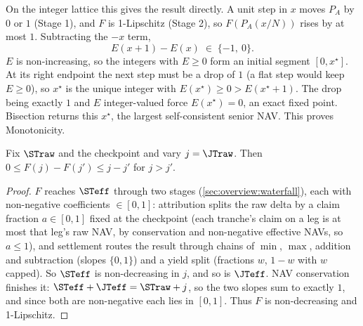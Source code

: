 On the integer lattice this gives the result directly. A unit step in
$x$ moves $P_A$ by $0$ or $1$ (Stage 1), and $F$ is 1-Lipschitz (Stage
2), so $F(P_A(x/N))$ rises by at most $1$. Subtracting the $-x$ term,
\[
  E(x{+}1) - E(x) \;\in\; \{-1,\ 0\}.
\]
$E$ is non-increasing, so the integers with $E \geq 0$ form an initial
segment $[0, x^\star]$. At its right endpoint the next step must be a drop of
$1$ (a flat step would keep $E \geq 0$), so $x^\star$ is the unique
integer with $E(x^\star) \geq 0 > E(x^\star{+}1)$. The drop being
exactly $1$ and $E$ integer-valued force $E(x^\star) = 0$, an exact
fixed point. Bisection returns this $x^\star$, the largest
self-consistent senior NAV. This proves Monotonicity.

\begin{lemma}
\label{lem:F}
Fix $\STraw$ and the checkpoint and vary $j = \JTraw$. Then
$0 \leq F(j) - F(j') \leq j - j'$ for $j > j'$.
\end{lemma}

\begin{proof}
$F$ reaches $\STeff$ through two stages
(\cref{sec:overview:waterfall}), each with non-negative coefficients
$\in [0,1]$: attribution splits the raw delta by a claim fraction
$a \in [0,1]$ fixed at the checkpoint (each tranche's claim on a leg is
at most that leg's raw NAV, by conservation and non-negative effective
NAVs, so $a \leq 1$), and
settlement routes the result
through chains of $\min$, $\max$, addition and subtraction (slopes
$\{0,1\}$) and a yield split (fractions $w$, $1-w$ with $w$ capped).
So $\STeff$ is non-decreasing in $j$, and so is $\JTeff$. NAV
conservation finishes it: $\STeff + \JTeff = \STraw + j$, so the two
slopes sum to exactly $1$, and since both are non-negative each lies in
$[0,1]$. Thus $F$ is non-decreasing and 1-Lipschitz.
\end{proof}

